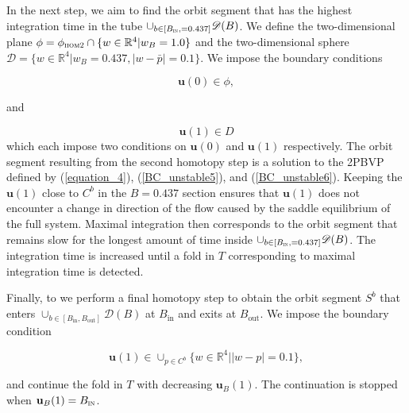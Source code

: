 \documentclass{ws-ijbc}
\begin{document}
In the next step, we aim to find the orbit segment that has the highest integration time in the tube $\cup_{b\in[B_{\textsc{in}}, = 0.437]} \mathscr{D}(B)$.  We define the two-dimensional plane $\phi = \phi_{\textsc{hom2}} \cap \{w \in \mathbb{R}^4 | w_B=1.0 \}$ and the two-dimensional sphere  $\mathscr{D} = \{w \in \mathbb{R}^4 | w_B = 0.437, |w-\bar{p}| = 0.1\}$.  We impose the boundary conditions

\begin{equation}
\mathbf{u}(0) \in \phi,
\label{BC_unstable5}
\end{equation}

and

\begin{equation}
\mathbf{u}(1) \in D
\label{BC_unstable6}
\end{equation}
\noindent
which each impose two conditions on $\mathbf{u}(0)$ and $\mathbf{u}(1)$ respectively.  The orbit segment resulting from the second homotopy step is a solution to the 2PBVP defined by (\ref{equation_4}), (\ref{BC_unstable5}), and (\ref{BC_unstable6}).  Keeping the $\mathbf{u}(1)$ close to $C^b$ in the $B = 0.437$ section ensures that $\mathbf{u}(1)$ does not encounter a change in direction of the flow caused by the saddle equilibrium of the full system.  Maximal integration then corresponds to the orbit segment that remains slow for the longest amount of time inside $\cup_{b\in[B_{\textsc{in}}, = 0.437]} \mathscr{D}(B)$.  The integration time is increased until a fold in $T$ corresponding to maximal integration time is detected.

Finally, to we perform a final homotopy step to obtain the orbit segment $S^b$ that enters $\cup_{b\in[B_{\mathrm{in}}, B_{\mathrm{out}}]} \mathscr{D}(B)$ at $B_{\mathrm{in}}$ and exits at $B_{\mathrm{out}}$.  We impose the boundary condition

\begin{equation}
\mathbf{u}(1) \in \cup_{p \in C^b}\{w \in \mathbb{R}^4 | |w-p| = 0.1\},
\label{BC_unstable7}
\end{equation}

\noindent
and continue the fold in $T$ with decreasing $\mathbf{u}_B(1)$.  The continuation is stopped when $\mathbf{u}_B(1) = B_{\textsc{in}}$.
\end{document}
